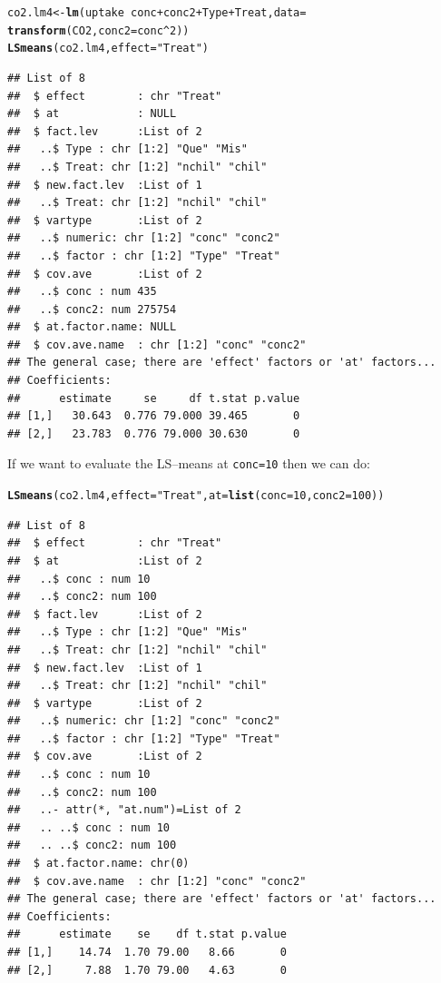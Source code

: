 \documentclass[10pt]{article}\usepackage[]{graphicx}\usepackage[]{color}
\makeatletter
\newcommand{\hlnum}[1]{\textcolor[rgb]{0.686,0.059,0.569}{#1}}%
\newcommand{\hlstr}[1]{\textcolor[rgb]{0.192,0.494,0.8}{#1}}%
\newcommand{\hlopt}[1]{\textcolor[rgb]{0,0,0}{#1}}%
\newcommand{\hlstd}[1]{\textcolor[rgb]{0.345,0.345,0.345}{#1}}%
\newcommand{\hlkwb}[1]{\textcolor[rgb]{0.69,0.353,0.396}{#1}}%
\newcommand{\hlkwc}[1]{\textcolor[rgb]{0.333,0.667,0.333}{#1}}%
\newcommand{\hlkwd}[1]{\textcolor[rgb]{0.737,0.353,0.396}{\textbf{#1}}}%
\newenvironment{kframe}{%
 \def\at@end@of@kframe{}%
 \ifinner\ifhmode%
  \def\at@end@of@kframe{\end{minipage}}%
  \begin{minipage}{\columnwidth}%
 \fi\fi%
 \def\FrameCommand##1{\hskip\@totalleftmargin \hskip-\fboxsep
 \colorbox{shadecolor}{##1}\hskip-\fboxsep
     \hskip-\linewidth \hskip-\@totalleftmargin \hskip\columnwidth}%
 \MakeFramed {\advance\hsize-\width
   \@totalleftmargin\z@ \linewidth\hsize
   \@setminipage}}%
 {\par\unskip\endMakeFramed%
 \at@end@of@kframe}
\newenvironment{knitrout}{}{} %
\def\code#1{\texttt{#1}}
\makeatother
\begin{document}
\begin{knitrout}
\color{fgcolor}\begin{kframe}
\begin{alltt}
\hlstd{co2.lm4} \hlkwb{<-} \hlkwd{lm}\hlstd{(uptake} \hlopt{~} \hlstd{conc} \hlopt{+} \hlstd{conc2} \hlopt{+} \hlstd{Type} \hlopt{+} \hlstd{Treat,} \hlkwc{data}\hlstd{=}
              \hlkwd{transform}\hlstd{(CO2,} \hlkwc{conc2}\hlstd{=conc}\hlopt{^}\hlnum{2}\hlstd{))}
\hlkwd{LSmeans}\hlstd{(co2.lm4,} \hlkwc{effect}\hlstd{=}\hlstr{"Treat"}\hlstd{)}
\end{alltt}
\begin{verbatim}
## List of 8
##  $ effect        : chr "Treat"
##  $ at            : NULL
##  $ fact.lev      :List of 2
##   ..$ Type : chr [1:2] "Que" "Mis"
##   ..$ Treat: chr [1:2] "nchil" "chil"
##  $ new.fact.lev  :List of 1
##   ..$ Treat: chr [1:2] "nchil" "chil"
##  $ vartype       :List of 2
##   ..$ numeric: chr [1:2] "conc" "conc2"
##   ..$ factor : chr [1:2] "Type" "Treat"
##  $ cov.ave       :List of 2
##   ..$ conc : num 435
##   ..$ conc2: num 275754
##  $ at.factor.name: NULL
##  $ cov.ave.name  : chr [1:2] "conc" "conc2"
## The general case; there are 'effect' factors or 'at' factors...
## Coefficients:
##      estimate     se     df t.stat p.value
## [1,]   30.643  0.776 79.000 39.465       0
## [2,]   23.783  0.776 79.000 30.630       0
\end{verbatim}
\end{kframe}
\end{knitrout}

If we want to evaluate the LS--means at \code{conc=10} then we can do:
\begin{knitrout}
\color{fgcolor}\begin{kframe}
\begin{alltt}
\hlkwd{LSmeans}\hlstd{(co2.lm4,} \hlkwc{effect}\hlstd{=}\hlstr{"Treat"}\hlstd{,} \hlkwc{at}\hlstd{=}\hlkwd{list}\hlstd{(}\hlkwc{conc}\hlstd{=}\hlnum{10}\hlstd{,} \hlkwc{conc2}\hlstd{=}\hlnum{100}\hlstd{))}
\end{alltt}
\begin{verbatim}
## List of 8
##  $ effect        : chr "Treat"
##  $ at            :List of 2
##   ..$ conc : num 10
##   ..$ conc2: num 100
##  $ fact.lev      :List of 2
##   ..$ Type : chr [1:2] "Que" "Mis"
##   ..$ Treat: chr [1:2] "nchil" "chil"
##  $ new.fact.lev  :List of 1
##   ..$ Treat: chr [1:2] "nchil" "chil"
##  $ vartype       :List of 2
##   ..$ numeric: chr [1:2] "conc" "conc2"
##   ..$ factor : chr [1:2] "Type" "Treat"
##  $ cov.ave       :List of 2
##   ..$ conc : num 10
##   ..$ conc2: num 100
##   ..- attr(*, "at.num")=List of 2
##   .. ..$ conc : num 10
##   .. ..$ conc2: num 100
##  $ at.factor.name: chr(0) 
##  $ cov.ave.name  : chr [1:2] "conc" "conc2"
## The general case; there are 'effect' factors or 'at' factors...
## Coefficients:
##      estimate    se    df t.stat p.value
## [1,]    14.74  1.70 79.00   8.66       0
## [2,]     7.88  1.70 79.00   4.63       0
\end{verbatim}
\end{kframe}
\end{knitrout}
\end{document}
